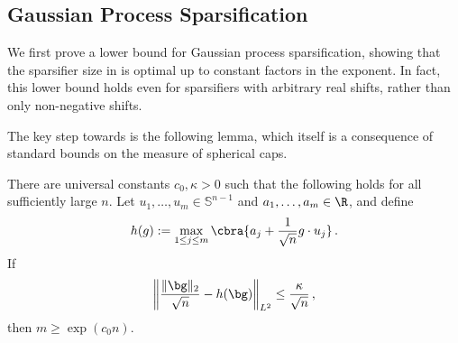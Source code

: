 \documentclass[11pt]{article}
\renewcommand{\S}{\mathbb{S}}
\begin{document}
\subsection{Gaussian Process Sparsification}
\label{subsec:lb-gp}

We first prove a lower bound for Gaussian process sparsification, showing that the sparsifier size in  is optimal up to constant factors in the exponent. 
In fact, this lower bound holds even for sparsifiers with arbitrary real shifts, rather than only non-negative shifts. 

\widthonegplbthm*

The key step towards  is the following lemma, which itself is a consequence of standard bounds on the measure of spherical caps. 

\begin{lemma}
\label{lem:continuous-sphere-lb}
	There are universal constants $c_0,\kappa>0$ such that the following holds
	for all sufficiently large $n$.  
	Let $u_1,\ldots,u_m\in \S^{n-1}$ and $a_1,\ldots,a_m\in\R$, and define
	\[
		h(g)
		:=
		\max_{1\leq j\leq m}
		\cbra{a_j+\frac{1}{\sqrt n} g\cdot u_j}\,.
	\]
	If
	\[
		\left\|
			\frac{\|\bg\|_2}{\sqrt n}-h(\bg)
		\right\|_{L^2}
		\leq 
		\frac{\kappa}{\sqrt n}\,,
	\]
	then $m\geq \exp(c_0 n)$.
\end{lemma}
\end{document}
